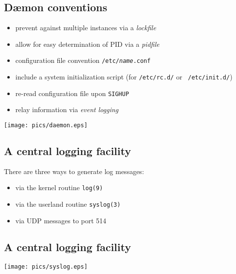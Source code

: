 \documentclass[xga]{xdvislides}
\begin{document}
\subsection{D\ae mon conventions}
\begin{itemize}
	\item prevent against multiple instances via a {\em lockfile}
	\item allow for easy determination of PID via a {\em pidfile}
	\item configuration file convention {\tt /etc/{\em name}.conf}
	\item include a system initialization script (for {\tt /etc/rc.d/} or {\tt
		/etc/init.d/})
	\item re-read configuration file upon {\tt SIGHUP}
	\item relay information via {\em event logging}
\end{itemize}

\vfill
\hfill\texttt{[image: pics/daemon.eps]} \\

\subsection{A central logging facility}

There are three ways to generate log messages:
\begin{itemize}
	\item via the kernel routine {\tt log(9)}
	\item via the userland routine {\tt syslog(3)}
	\item via UDP messages to port 514
\end{itemize}

\subsection{A central logging facility}
\begin{center}
	\texttt{[image: pics/syslog.eps]}
\end{center}
\end{document}
